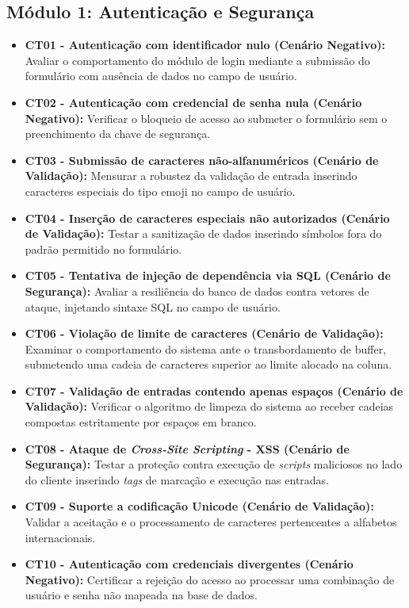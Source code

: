 \documentclass[12pt,a4paper]{article}
\begin{document}
\subsection{Módulo 1: Autenticação e Segurança}
\begin{itemize}[leftmargin=*]
    \item \textbf{CT01 - Autenticação com identificador nulo (Cenário Negativo):} Avaliar o comportamento do módulo de login mediante a submissão do formulário com ausência de dados no campo de usuário.
    \item \textbf{CT02 - Autenticação com credencial de senha nula (Cenário Negativo):} Verificar o bloqueio de acesso ao submeter o formulário sem o preenchimento da chave de segurança.
    \item \textbf{CT03 - Submissão de caracteres não-alfanuméricos (Cenário de Validação):} Mensurar a robustez da validação de entrada inserindo caracteres especiais do tipo emoji no campo de usuário.
    \item \textbf{CT04 - Inserção de caracteres especiais não autorizados (Cenário de Validação):} Testar a sanitização de dados inserindo símbolos fora do padrão permitido no formulário.
    \item \textbf{CT05 - Tentativa de injeção de dependência via SQL (Cenário de Segurança):} Avaliar a resiliência do banco de dados contra vetores de ataque, injetando sintaxe SQL no campo de usuário.
    \item \textbf{CT06 - Violação de limite de caracteres (Cenário de Validação):} Examinar o comportamento do sistema ante o transbordamento de buffer, submetendo uma cadeia de caracteres superior ao limite alocado na coluna.
    \item \textbf{CT07 - Validação de entradas contendo apenas espaços (Cenário de Validação):} Verificar o algoritmo de limpeza do sistema ao receber cadeias compostas estritamente por espaços em branco.
    \item \textbf{CT08 - Ataque de \textit{Cross-Site Scripting} - XSS (Cenário de Segurança):} Testar a proteção contra execução de \textit{scripts} maliciosos no lado do cliente inserindo \textit{tags} de marcação e execução nas entradas.
    \item \textbf{CT09 - Suporte a codificação Unicode (Cenário de Validação):} Validar a aceitação e o processamento de caracteres pertencentes a alfabetos internacionais.
    \item \textbf{CT10 - Autenticação com credenciais divergentes (Cenário Negativo):} Certificar a rejeição do acesso ao processar uma combinação de usuário e senha não mapeada na base de dados.

\end{itemize}
\end{document}
